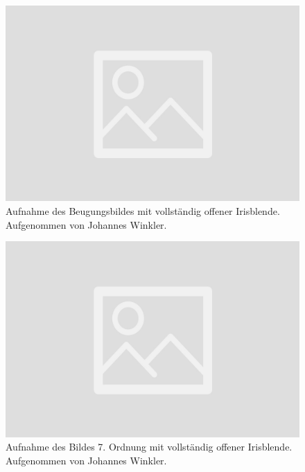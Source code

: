 \documentclass{article}
\begin{document}
\begin{minipage}[t]{.45\textwidth}
\begin{figure}[H]
\includegraphics[scale=0.1]{jw/Beugungsbild_voll.jpg}
\caption{Aufnahme des Beugungsbildes mit vollständig offener Irisblende. Aufgenommen von Johannes Winkler.}
\label{fig:bbild_voll_jw}
\end{figure}
\end{minipage}
\hfill
\noindent
\begin{minipage}[t]{.45\textwidth}
\begin{figure}[H]
\includegraphics[scale=0.1]{jw/Bild_voll.jpg}
\caption{Aufnahme des Bildes 7. Ordnung mit vollständig offener Irisblende. Aufgenommen von Johannes Winkler.}\label{fig:bild_voll_jw}
\end{figure}
\end{minipage}
\end{document}
